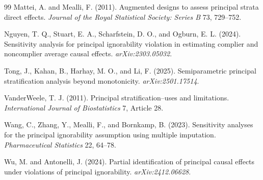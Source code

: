 \documentclass[11pt]{article}
\theoremstyle{definition}
\theoremstyle{plain}
\theoremstyle{remark}
\begin{document}
\begin{thebibliography}{99}
Mattei, A. and Mealli, F. (2011).
Augmented designs to assess principal strata direct effects.
\emph{Journal of the Royal Statistical Society: Series B} 73, 729--752.

Nguyen, T. Q., Stuart, E. A., Scharfstein, D. O., and Ogburn, E. L. (2024).
Sensitivity analysis for principal ignorability violation in estimating
complier and noncomplier average causal effects.
\emph{arXiv:2303.05032}.

Tong, J., Kahan, B., Harhay, M. O., and Li, F. (2025).
Semiparametric principal stratification analysis beyond monotonicity.
\emph{arXiv:2501.17514}.

VanderWeele, T. J. (2011).
Principal stratification--uses and limitations.
\emph{International Journal of Biostatistics} 7, Article 28.

Wang, C., Zhang, Y., Mealli, F., and Bornkamp, B. (2023).
Sensitivity analyses for the principal ignorability assumption using multiple
imputation.
\emph{Pharmaceutical Statistics} 22, 64--78.

Wu, M. and Antonelli, J. (2024).
Partial identification of principal causal effects under violations of
principal ignorability.
\emph{arXiv:2412.06628}.
\end{thebibliography}
\end{document}
